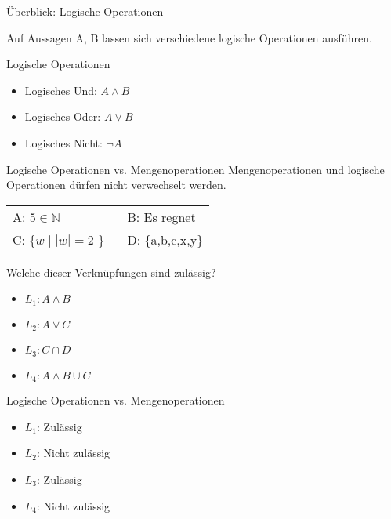 \begin{frame}{Überblick: Logische Operationen}
	
	Auf \alert{Aussagen} A, B lassen sich verschiedene logische Operationen ausführen.
	
	\begin{exampleblock}{Logische Operationen}
		\begin{itemize}
			\item Logisches Und: $A \wedge B$
			\item Logisches Oder: $A \vee B$
			\item Logisches Nicht: $\neg A$
		\end{itemize}
	\end{exampleblock}
\end{frame}

{
	\begin{frame}{Logische Operationen vs. Mengenoperationen}
		\alert{Mengenoperationen und logische Operationen dürfen nicht verwechselt werden.}
		\begin{table}[]
			\begin{tabular}{l l}
				A: $5 \in \mathbb{N}$ & B: Es regnet\\
				C: \{$w \mid |w|=2$ \} \ & D: \{a,b,c,x,y\}\\
			\end{tabular}
		\end{table}
		\begin{block}{Welche dieser Verknüpfungen sind zulässig?}
			\begin{itemize}
				\item $L_1: A \wedge B$
				\item $L_2: A \vee C$
				\item $L_3: C \cap D$
				\item $L_4: A \wedge B \cup C$
			\end{itemize}
		\end{block}
	\end{frame}
}

{
	\begin{frame}[fragile]{Logische Operationen vs. Mengenoperationen}
		\begin{itemize}[<+- | alert@+>]
			\item $L_1$: Zulässig
			\item $L_2$: Nicht zulässig
			\item $L_3$: Zulässig
			\item $L_4$: Nicht zulässig
		\end{itemize}
	\end{frame}
}



